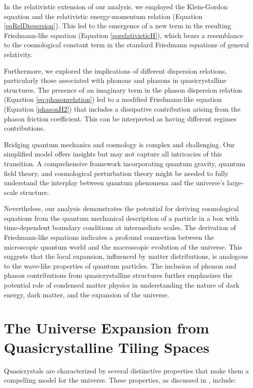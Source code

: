 \documentclass{article}
\begin{document}
In the relativistic extension of our analysis, we employed the Klein-Gordon equation and the relativistic energy-momentum relation (Equation \ref{eqRelDispersion}). This led to the emergence of a new term in the resulting Friedmann-like equation (Equation \ref{eqrelativisticH}), which bears a resemblance to the cosmological constant term in the standard Friedmann equations of general relativity.

Furthermore, we explored the implications of different dispersion relations, particularly those associated with phonons and phasons in quasicrystalline structures. The presence of an imaginary term in the phason dispersion relation (Equation \ref{eq:phasonrelation}) led to a modified Friedmann-like equation (Equation \ref{phasonH2}) that includes a dissipative contribution arising from the phason friction coefficient. This can be interpreted as having different regimes contributions. 


Bridging quantum mechanics and cosmology is complex and challenging. Our simplified model offers insights but may not capture all intricacies of this transition. A comprehensive framework incorporating quantum gravity, quantum field theory, and cosmological perturbation theory might be needed to fully understand the interplay between quantum phenomena and the universe's large-scale structure.

Nevertheless, our analysis demonstrates the potential for deriving cosmological equations from the quantum mechanical description of a particle in a box with time-dependent boundary conditions at intermediate scales. The derivation of Friedmann-like equations indicates a profound connection between the microscopic quantum world and the macroscopic evolution of the universe. This suggests that the local expansion, influenced by matter distributions, is analogous to the wave-like properties of quantum particles. The inclusion of phonon and phason contributions from quasicrystalline structures further emphasizes the potential role of condensed matter physics in understanding the nature of dark energy, dark matter, and the expansion of the universe.




\section{The Universe Expansion from Quasicrystalline Tiling Spaces}
\label{sec:freedmaneqqc}
Quasicrystals are characterized by several distinctive properties that make them a compelling model for the universe. These properties, as discussed in \cite{BaakeGrimm}, include: 
\end{document}

